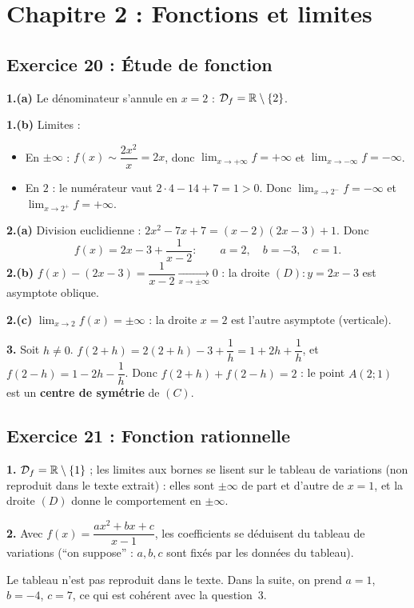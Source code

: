 \section{Chapitre 2 : Fonctions et limites}

\subsection{Exercice 20 : \'Etude de fonction}

\textbf{1.(a)} Le d\'enominateur s'annule en $x=2$ : $\mathcal D_f=\mathbb{R}\setminus\{2\}$.

\textbf{1.(b)} Limites :
\begin{itemize}
  \item En $\pm\infty$ : $f(x)\sim\dfrac{2x^2}{x}=2x$, donc $\lim_{x\to+\infty}f=+\infty$ et $\lim_{x\to-\infty}f=-\infty$.
  \item En $2$ : le num\'erateur vaut $2\cdot4-14+7=1>0$. Donc $\lim_{x\to2^-}f=-\infty$ et $\lim_{x\to2^+}f=+\infty$.
\end{itemize}

\textbf{2.(a)} Division euclidienne : $2x^2-7x+7=(x-2)(2x-3)+1$. Donc
\[
f(x)=2x-3+\frac{1}{x-2} : \qquad a=2,\quad b=-3,\quad c=1.
\]
\textbf{2.(b)} $f(x)-(2x-3)=\dfrac{1}{x-2}\xrightarrow[x\to\pm\infty]{}0$ : la droite $(D):y=2x-3$ est asymptote oblique.

\textbf{2.(c)} $\lim_{x\to2}f(x)=\pm\infty$ : la droite $x=2$ est l'autre asymptote (verticale).

\textbf{3.} Soit $h\neq0$. $f(2+h)=2(2+h)-3+\dfrac1h=1+2h+\dfrac1h$, et
$f(2-h)=1-2h-\dfrac1h$. Donc $f(2+h)+f(2-h)=2$ : le point $A(2;1)$ est un \textbf{centre de sym\'etrie} de $(C)$.

\subsection{Exercice 21 : Fonction rationnelle}

\textbf{1.} $\mathcal D_f=\mathbb{R}\setminus\{1\}$ ; les limites aux bornes se lisent sur le tableau de variations
(non reproduit dans le texte extrait) : elles sont $\pm\infty$ de part et d'autre de $x=1$, et la droite
$(D)$ donne le comportement en $\pm\infty$.

\textbf{2.} Avec $f(x)=\dfrac{ax^2+bx+c}{x-1}$, les coefficients se d\'eduisent du tableau de variations
(``on suppose'' : $a,b,c$ sont fix\'es par les donn\'ees du tableau).
\begin{rem} Le tableau n'est pas reproduit dans le texte. Dans la suite, on prend $a=1$, $b=-4$, $c=7$,
ce qui est coh\'erent avec la question~3.\end{rem}

